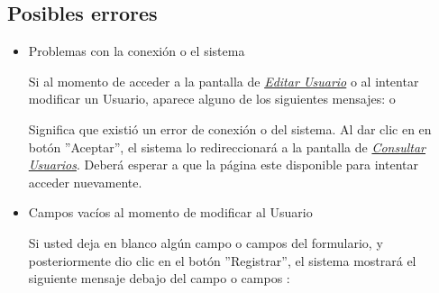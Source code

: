                 \subsection{Posibles errores}
                    \begin{itemize}
                        \item Problemas con la conexión o el sistema
                    
                            Si al momento de acceder a la pantalla de \hyperlink{editarUs}{\textit{Editar Usuario}} o al intentar modificar un Usuario, aparece alguno de los siguientes mensajes:
                            o 
                        
                            Significa que existió un error de conexión o del sistema. Al dar clic en en botón ''Aceptar'', el sistema lo redireccionará  a la pantalla de \hyperlink{consultarUs}{\textit{Consultar Usuarios}}. Deberá esperar a que la página este disponible para intentar acceder nuevamente.
                    
                        \item Campos vacíos al momento de modificar al Usuario
                    
                            Si usted deja en blanco algún campo o campos del formulario, y posteriormente dio clic en el botón ''Registrar'', el sistema mostrará el siguiente mensaje debajo del campo o campos :
                           
                           

\end{itemize}
